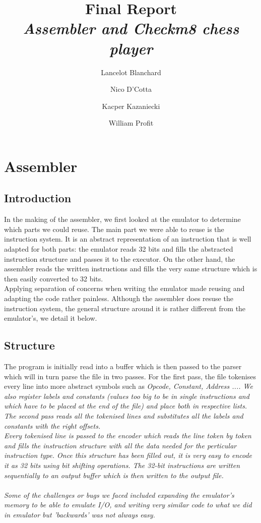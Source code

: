 \documentclass[11pt]{article}
\begin{document}
\title{Final Report\\
  \small{\em{Assembler and Checkm8 chess player}}}
\author{Lancelot Blanchard \and Nico D'Cotta \and Kacper Kazaniecki \and William Profit}

\maketitle

\section{Assembler}

\subsection{Introduction}

In the making of the assembler, we first looked at the emulator to determine
which parts we could reuse. The main part we were able to reuse is the
instruction system. It is an abstract representation of an instruction that is
well adapted for both parts: the emulator reads 32 bits and fills the abstracted
instruction structure and passes it to the executor. On the other hand, the
assembler reads the written instructions and fills the very same structure which
is then easily converted to 32 bits. \\ Applying separation of concerns when
writing the emulator made reusing and adapting the code rather painless.
Although the assembler does resuse the instruction system, the general structure
around it is rather different from the emulator's, we detail it below.

\subsection{Structure}

The program is initially read into a buffer which is then passed to the parser
which will in turn parse the file in two passes. For the first pass, the file
tokenises every line into more abstract symbols such as \em Opcode, Constant,
Address ...\em. We also register labels and constants (values too big to be in
single instructions and which have to be placed at the end of the file) and
place both in respective lists. The second pass reads all the tokenised lines
and substitutes all the labels and constants with the right offsets.\\

Every tokenised line is passed to the encoder which reads the line token by
token and fills the instruction structure with all the data needed for the
perticular instruction type. Once this structure has been filled out, it is very
easy to encode it as 32 bits using bit shifting operations. The 32-bit
instructions are written sequentially to an output buffer which is then written
to the output file. \\ \\
Some of the challenges or bugs we faced included expanding the emulator's memory
to be able to emulate I/O, and writing very similar code to what we did in
emulator but 'backwards' was not always easy.
\end{document}
